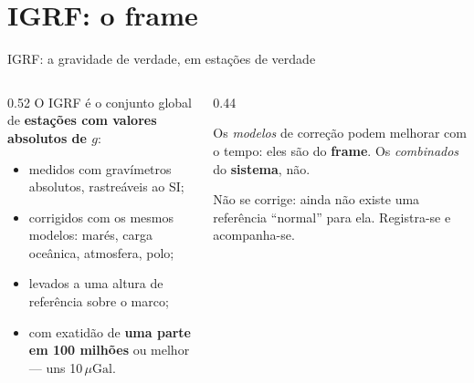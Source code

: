 \documentclass[aspectratio=169,11pt]{beamer}
\newcommand{\bnum}[1]{\textbf{\textcolor{mTeal}{#1}}}
\newcommand{\sist}[1]{\textcolor{corIdeal}{\textbf{#1}}}
\newcommand{\fram}[1]{\textcolor{corMedido}{\textbf{#1}}}
\newcommand{\uGal}{\ensuremath{\,\mu\mathrm{Gal}}\xspace}
\begin{document}
\section{IGRF: o frame}

\begin{frame}{IGRF: a gravidade de verdade, em estações de verdade}
  \begin{columns}[T]
    \begin{column}{0.52\textwidth}
      O IGRF é o conjunto global de \bnum{estações com valores absolutos de $g$}:
      \begin{itemize}
        \item medidos com gravímetros absolutos, rastreáveis ao SI;
        \item corrigidos com os mesmos modelos: marés, carga oceânica, atmosfera, polo;
        \item levados a uma altura de referência sobre o marco;
        \item com exatidão de \bnum{uma parte em 100 milhões} ou melhor --- uns 10\uGal.
      \end{itemize}
    \end{column}
    \begin{column}{0.44\textwidth}
      \begin{cuidado}[title={Frame muda, sistema não}]
        \small Os \emph{modelos} de correção podem melhorar com o tempo: eles são do
        \fram{frame}. Os \emph{combinados} do \sist{sistema}, não.
      \end{cuidado}
      \medskip
      \begin{ideia}[title={E a água no solo?}]
        \small Não se corrige: ainda não existe uma referência ``normal'' para ela.
        Registra-se e acompanha-se.
      \end{ideia}
    \end{column}
  \end{columns}
\end{frame}
\end{document}
